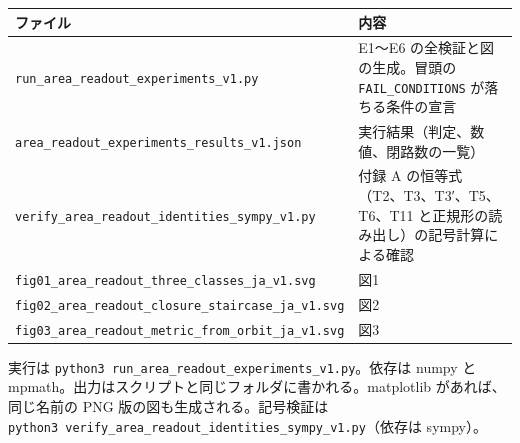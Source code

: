\documentclass[
  a4paper,
]{ltjsarticle}
\newcounter{none} %
\begin{document}
{\def\LTcaptype{none} %
\begin{longtable}[]{@{}
  >{\raggedright\arraybackslash}p{}
  >{\raggedright\arraybackslash}p{}@{}}
\toprule\noalign{}
\begin{minipage}[b]{\linewidth}\raggedright
ファイル
\end{minipage} & \begin{minipage}[b]{\linewidth}\raggedright
内容
\end{minipage} \\
\midrule\noalign{}
\endhead
\bottomrule\noalign{}
\endlastfoot
\texttt{run\_area\_readout\_experiments\_v1.py} & E1〜E6
の全検証と図の生成。冒頭の \texttt{FAIL\_CONDITIONS}
が落ちる条件の宣言 \\
\texttt{area\_readout\_experiments\_results\_v1.json} &
実行結果（判定、数値、閉路数の一覧） \\
\texttt{verify\_area\_readout\_identities\_sympy\_v1.py} & 付録 A
の恒等式（T2、T3、T3′、T5、T6、T11
と正規形の読み出し）の記号計算による確認 \\
\texttt{fig01\_area\_readout\_three\_classes\_ja\_v1.svg} & 図1 \\
\texttt{fig02\_area\_readout\_closure\_staircase\_ja\_v1.svg} & 図2 \\
\texttt{fig03\_area\_readout\_metric\_from\_orbit\_ja\_v1.svg} & 図3 \\
\end{longtable}
}

実行は \texttt{python3\ run\_area\_readout\_experiments\_v1.py}。依存は
numpy と mpmath。出力はスクリプトと同じフォルダに書かれる。matplotlib
があれば、同じ名前の PNG 版の図も生成される。記号検証は
\texttt{python3\ verify\_area\_readout\_identities\_sympy\_v1.py}（依存は
sympy）。
\end{document}
